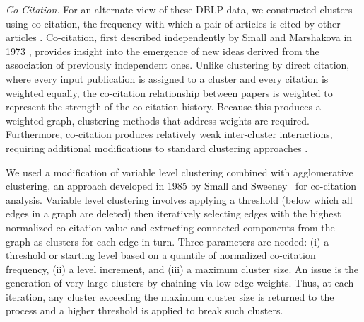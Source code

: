 \emph{Co-Citation.} For an alternate view of these DBLP data, we constructed clusters using co-citation, the frequency with which a pair of articles is cited by other articles \cite{small_co-citation_1973,marshakova-shaikevich_co-citation_1973}. Co-citation, first described independently by Small and Marshakova in 1973 \cite{marshakova-shaikevich_co-citation_1973}, provides insight into the emergence of new ideas derived from the association of previously independent ones. Unlike clustering by direct citation, where every input publication is assigned to a cluster and every citation is weighted equally, the co-citation relationship between papers is weighted to represent the strength of the co-citation history.
Because this produces a weighted graph, clustering methods that address weights are required.
Furthermore, co-citation produces relatively weak inter-cluster interactions, requiring additional modifications to standard clustering approaches \cite{boyack_cocitation_2010,boyack_improving_2013,small_structure_1974,small_clustering_1985}. 

We used a modification of variable level clustering combined with agglomerative clustering, an approach developed in 1985 by Small and Sweeney~\cite{small_clustering_1985} for co-citation analysis.
Variable level clustering involves applying a threshold (below which all edges in a graph are deleted) then iteratively selecting edges with the highest normalized co-citation value and extracting connected components from the graph as clusters for each edge in turn. Three parameters are needed: (i) a threshold or starting level based on a quantile of normalized co-citation frequency, (ii) a level increment, and (iii) a maximum cluster size. An issue is the generation of very large clusters by chaining via low edge weights.  Thus, at each iteration, any cluster exceeding the maximum cluster size  is returned to the process and a higher threshold is applied to break such clusters.

